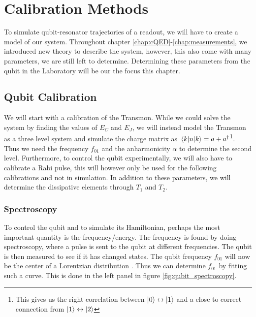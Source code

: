 \chapter{Calibration Methods}\label{chap:calibration}
To simulate qubit-resonator trajectories of a readout, we will have to create a model of our system. Throughout chapter \ref{chap:cQED}-\ref{chap:measurements}, we introduced new theory to describe the system, however, this also come with many parameters, we are still left to determine. Determining these parameters from the qubit in the Laboratory will be our the focus this chapter. 




\section{Qubit Calibration}
We will start with a calibration of the Transmon. While we could solve the system by finding the values of $E_C$ and $E_J$, we will instead model the Transmon as a three level system and simulate the charge matrix as $\mel{k}{n}{k} = a + a^\dagger$\footnote{This gives us the right correlation between $\ket{0}\leftrightarrow \ket{1}$ and a close to correct connection from $\ket{1}\leftrightarrow\ket{2}$}. Thus we need the frequency $f_{01}$ and the anharmonicity $\alpha$ to determine the second level. Furthermore, to control the qubit experimentally, we will also have to calibrate a Rabi pulse, this will however only be used for the following calibrations and not in simulation. In addition to these parameters, we will determine the dissipative elements through $T_1$ and $T_2$.

\subsection{Spectroscopy}\label{sec:qubit_spectroscopy}
To control the qubit and to simulate its Hamiltonian, perhaps the most important quantity is the frequency/energy. The frequency is found by doing spectroscopy, where a pulse is sent to the qubit at different frequencies. The qubit is then measured to see if it has changed states. The qubit frequency $f_{01}$ will now be the center of a Lorentzian distribution \cite{Find citation}. Thus we can determine $f_{01}$ by fitting such a curve. This is done in the left panel in figure \ref{fig:qubit_spectroscopy}.

